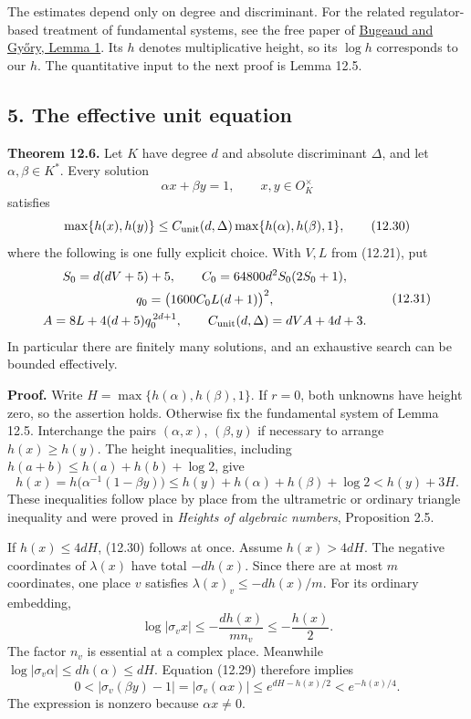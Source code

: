 \documentclass[
  11pt,
  a4paper,
]{article}
\begin{document}
The estimates depend only on degree and discriminant. For the related
regulator-based treatment of fundamental systems, see the free paper of
\href{https://matwbn.icm.edu.pl/ksiazki/aa/aa74/aa7416.pdf}{Bugeaud and
Győry, Lemma 1}. Its \(h\) denotes multiplicative height, so its
\(\log h\) corresponds to our \(h\). The quantitative input to the next
proof is Lemma 12.5.

\subsection{5. The effective unit
equation}\label{the-effective-unit-equation}

\textbf{Theorem 12.6.} Let \(K\) have degree \(d\) and absolute
discriminant \(\Delta\), and let \(\alpha,\beta\in K^*\). Every solution
\[
\alpha x+\beta y=1,\qquad x,y\in O_K^\times
\tag{12.29}
\] satisfies \[
\max\{h(x),h(y)\}\le C_{\rm unit}(d,\Delta)
                 \max\{h(\alpha),h(\beta),1\},
\tag{12.30}
\] where the following is one fully explicit choice. With \(V,L\) from
(12.21), put \[
\begin{gathered}
S_0=d(dV+5)+5,\qquad C_0=64800d^2S_0(2S_0+1),\\
q_0=\bigl(1600C_0L(d+1)\bigr)^2,\\
A=8L+4(d+5)q_0^{\,2d+1},\qquad
C_{\rm unit}(d,\Delta)=dVA+4d+3.
\end{gathered}
\tag{12.31}
\] In particular there are finitely many solutions, and an exhaustive
search can be bounded effectively.

\textbf{Proof.} Write \(H=\max\{h(\alpha),h(\beta),1\}\). If \(r=0\),
both unknowns have height zero, so the assertion holds. Otherwise fix
the fundamental system of Lemma 12.5. Interchange the pairs
\((\alpha,x)\), \((\beta,y)\) if necessary to arrange \(h(x)\ge h(y)\).
The height inequalities, including \(h(a+b)\le h(a)+h(b)+\log2\), give
\[
h(x)=h\bigl(\alpha^{-1}(1-\beta y)\bigr)
 \le h(y)+h(\alpha)+h(\beta)+\log2<h(y)+3H.
\tag{12.32}
\] These inequalities follow place by place from the ultrametric or
ordinary triangle inequality and were proved in \emph{Heights of
algebraic numbers}, Proposition 2.5.

If \(h(x)\le4dH\), (12.30) follows at once. Assume \(h(x)>4dH\). The
negative coordinates of \(\lambda(x)\) have total \(-dh(x)\). Since
there are at most \(m\) coordinates, one place \(v\) satisfies
\(\lambda(x)_v\le-dh(x)/m\). For its ordinary embedding, \[
\log|\sigma_vx|\le-\frac{dh(x)}{mn_v}\le-\frac{h(x)}2.
\tag{12.33}
\] The factor \(n_v\) is essential at a complex place. Meanwhile
\(\log|\sigma_v\alpha|\le dh(\alpha)\le dH\). Equation (12.29) therefore
implies \[
0<|\sigma_v(\beta y)-1|
 =|\sigma_v(\alpha x)|
 \le e^{dH-h(x)/2}<e^{-h(x)/4}.
\tag{12.34}
\] The expression is nonzero because \(\alpha x\ne0\).
\end{document}
